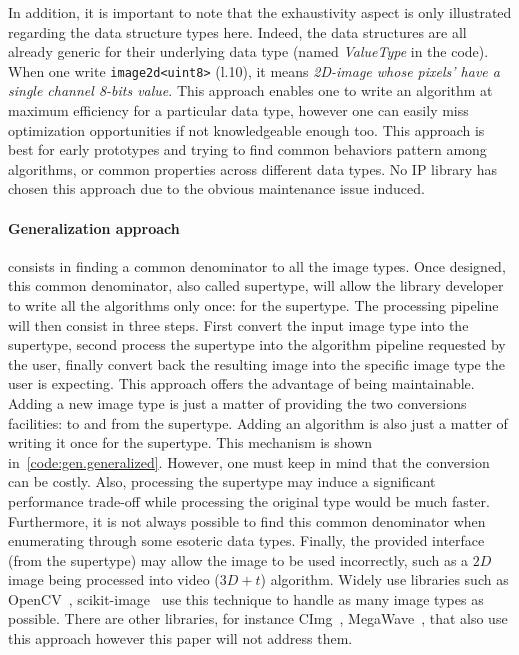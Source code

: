 In addition, it is important to note that the exhaustivity aspect is only illustrated regarding the data structure types
here. Indeed, the data structures are all already generic for their underlying data type (named \emph{ValueType} in the
code). When one write \texttt{image2d<uint8>} (l.10), it means \emph{2D-image whose pixels' have a single channel 8-bits
  value}. This approach enables one to write an algorithm at maximum efficiency for a particular data type, however one
can easily miss optimization opportunities if not knowledgeable enough too. This approach is best for early prototypes
and trying to find common behaviors pattern among algorithms, or common properties across different data types. No IP
library has chosen this approach due to the obvious maintenance issue induced.

\paragraph{Generalization approach} consists in finding a common denominator to all the image types. Once designed, this
common denominator, also called supertype, will allow the library developer to write all the algorithms only once: for
the supertype. The processing pipeline will then consist in three steps. First convert the input image type into the
supertype, second process the supertype into the algorithm pipeline requested by the user, finally convert back the
resulting image into the specific image type the user is expecting. This approach offers the advantage of being
maintainable. Adding a new image type is just a matter of providing the two conversions facilities: to and from the
supertype. Adding an algorithm is also just a matter of writing it once for the supertype. This mechanism is shown
in~\ref{code:gen.generalized}. However, one must keep in mind that the conversion can be costly. Also, processing the
supertype may induce a significant performance trade-off while processing the original type would be much faster.
Furthermore, it is not always possible to find this common denominator when enumerating through some esoteric data
types. Finally, the provided interface (from the supertype) may allow the image to be used incorrectly, such as a $2D$
image being processed into video ($3D+t$) algorithm. Widely use libraries such as
OpenCV~\cite{bradski.2000.opencv}, scikit-image~\cite{vanderwalt.2014.skimage} use this technique to handle as many
image types as possible. There are other libraries, for instance CImg~\cite{tschumperle.2012.cimg},
MegaWave~\cite{froment.2012.megawave}, that also use this approach however this paper will not address them.

